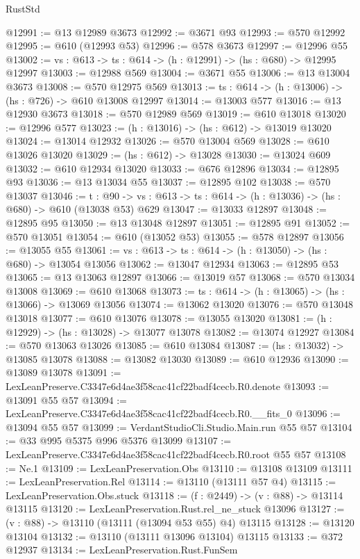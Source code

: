 \begin{lexlean}{RustStd}
\begin{coremodule}
@12991 := @13 @12989 @3673
@12992 := @3671 @93
@12993 := @570 @12992
@12995 := @610 (@12993 @53)
@12996 := @578 @3673
@12997 := @12996 @55
@13002 := {vs : @613} -> {ts : @614} -> (h : @12991) -> (hs : @680) -> @12995 @12997
@13003 := @12988 @569
@13004 := @3671 @55
@13006 := @13 @13004 @3673
@13008 := @570 @12975 @569
@13013 := {ts : @614} -> (h : @13006) -> (hs : @726) -> @610 @13008 @12997
@13014 := @13003 @577
@13016 := @13 @12930 @3673
@13018 := @570 @12989 @569
@13019 := @610 @13018
@13020 := @12996 @577
@13023 := (h : @13016) -> (hs : @612) -> @13019 @13020
@13024 := @13014 @12932
@13026 := @570 @13004 @569
@13028 := @610 @13026 @13020
@13029 := (hs : @612) -> @13028
@13030 := @13024 @609
@13032 := @610 @12934 @13020
@13033 := @676 @12896
@13034 := @12895 @93
@13036 := @13 @13034 @55
@13037 := @12895 @102
@13038 := @570 @13037
@13046 := {t : @90} ->
  {vs : @613} -> {ts : @614} -> (h : @13036) -> (hs : @680) -> @610 (@13038 @53) @629
@13047 := @13033 @12897
@13048 := @12895 @95
@13050 := @13 @13048 @12897
@13051 := @12895 @91
@13052 := @570 @13051
@13054 := @610 (@13052 @53)
@13055 := @578 @12897
@13056 := @13055 @55
@13061 := {vs : @613} -> {ts : @614} -> (h : @13050) -> (hs : @680) -> @13054 @13056
@13062 := @13047 @12934
@13063 := @12895 @53
@13065 := @13 @13063 @12897
@13066 := @13019 @57
@13068 := @570 @13034 @13008
@13069 := @610 @13068
@13073 := {ts : @614} -> (h : @13065) -> (hs : @13066) -> @13069 @13056
@13074 := @13062 @13020
@13076 := @570 @13048 @13018
@13077 := @610 @13076
@13078 := @13055 @13020
@13081 := (h : @12929) -> (hs : @13028) -> @13077 @13078
@13082 := @13074 @12927
@13084 := @570 @13063 @13026
@13085 := @610 @13084
@13087 := (hs : @13032) -> @13085 @13078
@13088 := @13082 @13030
@13089 := @610 @12936
@13090 := @13089 @13078
@13091 := LexLeanPreserve.C3347e6d4ae3f58cac41cf22badf4cecb.R0.denote
@13093 := @13091 @55 @57
@13094 := LexLeanPreserve.C3347e6d4ae3f58cac41cf22badf4cecb.R0.__fits_0
@13096 := @13094 @55 @57
@13099 := VerdantStudioCli.Studio.Main.run @55 @57
@13104 := @33 @995 @5375 @996 @5376 @13099
@13107 := LexLeanPreserve.C3347e6d4ae3f58cac41cf22badf4cecb.R0.root @55 @57
@13108 := Ne.{1}
@13109 := LexLeanPreservation.Obs
@13110 := @13108 @13109
@13111 := LexLeanPreservation.Rel
@13114 := @13110 (@13111 @57 @4)
@13115 := LexLeanPreservation.Obs.stuck
@13118 := (f : @2449) -> (v : @88) -> @13114 @13115
@13120 := LexLeanPreservation.Rust.rel_ne_stuck @13096
@13127 := (v : @88) -> @13110 (@13111 (@13094 @53 @55) @4) @13115
@13128 := @13120 @13104
@13132 := @13110 (@13111 @13096 @13104) @13115
@13133 := @372 @12937
@13134 := LexLeanPreservation.Rust.FunSem

\end{coremodule}
\end{lexlean}
